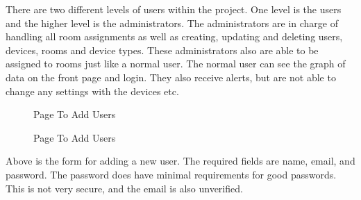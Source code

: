 \documentclass{report}
\begin{document}
\indent
There are two different levels of users within the project. One level is the users and the higher level is the administrators.
\newline
\indent
The administrators are in charge of handling all room assignments as well as creating, updating and deleting users, devices, rooms and device types. These administrators also are able to be assigned to rooms just like a normal user.
\newline
\indent
The normal user can see the graph of data on the front page and login. They also receive alerts, but are not able to change any settings with the devices etc.
\begin{figure}[H]
	\caption{Page To Add Users}
\end{figure}

\begin{figure}[H]
	\caption{Page To Add Users}
\end{figure}
\indent
Above is the form for adding a new user. The required fields are name, email, and password. The password does have minimal requirements for good passwords. This is not very secure, and the email is also unverified.
\newpage
\end{document}
